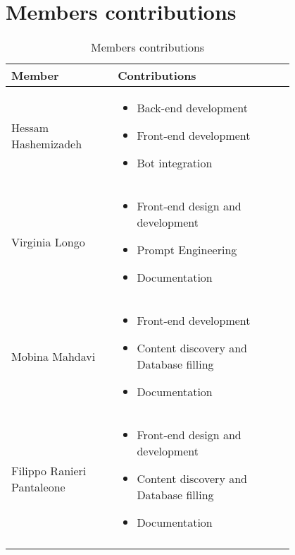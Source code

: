\chapter{Members contributions}
\begin{longtable}
    {|m{0.3\linewidth}|m{0.5\linewidth}|}
            \hline
            \textbf{Member} & \textbf{Contributions}\\
            \hline
            \endhead
                Hessam Hashemizadeh &
                \begin{itemize}
                    \item Back-end development
                    \item Front-end development
                    \item Bot integration
                \end{itemize} \\
            \hline
                 Virginia Longo &
                 \begin{itemize}
                    \item Front-end design and development
                    \item Prompt Engineering
                    \item Documentation
                \end{itemize} \\
            \hline
                 Mobina Mahdavi &
                 \begin{itemize}
                    \item Front-end development
                    \item Content discovery and Database filling
                    \item Documentation
                \end{itemize} \\
            \hline
                Filippo Ranieri Pantaleone &
                \begin{itemize}
                    \item Front-end design and development
                    \item Content discovery and Database filling
                    \item Documentation
                \end{itemize} \\
            \hline
            \caption{Members contributions}
            \label{table:mem_contributions}
\end{longtable}
